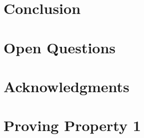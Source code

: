 \documentclass[11pt,titlepage]{article}
\begin{document}
\section{Conclusion}

\section{Open Questions}


\section*{Acknowledgments}


\appendix
\section{Proving Property 1}
\label{appendix:prop1}




\end{document}
